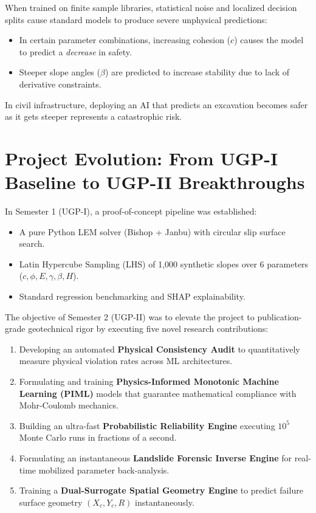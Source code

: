 \documentclass[12pt,a4paper,oneside]{report}
\begin{document}
When trained on finite sample libraries, statistical noise and localized decision splits cause standard models to produce severe unphysical predictions:
\begin{itemize}
  \item In certain parameter combinations, increasing cohesion ($c$) causes the model to predict a \textit{decrease} in safety.
  \item Steeper slope angles ($\beta$) are predicted to increase stability due to lack of derivative constraints.
\end{itemize}
In civil infrastructure, deploying an AI that predicts an excavation becomes safer as it gets steeper represents a catastrophic risk.

\section{Project Evolution: From UGP-I Baseline to UGP-II Breakthroughs}
In Semester 1 (UGP-I), a proof-of-concept pipeline was established:
\begin{itemize}
  \item A pure Python LEM solver (Bishop + Janbu) with circular slip surface search.
  \item Latin Hypercube Sampling (LHS) of 1,000 synthetic slopes over 6 parameters ($c, \phi, E, \gamma, \beta, H$).
  \item Standard regression benchmarking and SHAP explainability.
\end{itemize}

The objective of Semester 2 (UGP-II) was to elevate the project to publication-grade geotechnical rigor by executing five novel research contributions:
\begin{enumerate}
  \item Developing an automated \textbf{Physical Consistency Audit} to quantitatively measure physical violation rates across ML architectures.
  \item Formulating and training \textbf{Physics-Informed Monotonic Machine Learning (PIML)} models that guarantee mathematical compliance with Mohr-Coulomb mechanics.
  \item Building an ultra-fast \textbf{Probabilistic Reliability Engine} executing $10^5$ Monte Carlo runs in fractions of a second.
  \item Formulating an instantaneous \textbf{Landslide Forensic Inverse Engine} for real-time mobilized parameter back-analysis.
  \item Training a \textbf{Dual-Surrogate Spatial Geometry Engine} to predict failure surface geometry $(X_c, Y_c, R)$ instantaneously.
\end{enumerate}
\end{document}
